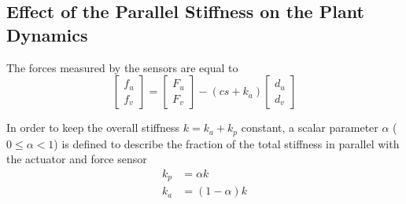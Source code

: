 \documentclass{ISMA_USD2020}
\begin{document}
\subsection{Effect of the Parallel Stiffness on the Plant Dynamics}
\label{sec:orgb29f2a0}
The forces measured by the sensors are equal to
\begin{equation}
\label{eq:measured_force_kp}
  \begin{bmatrix} f_{u} \\ f_{v} \end{bmatrix} =
  \begin{bmatrix} F_u \\ F_v \end{bmatrix} - (c s + k_a)
  \begin{bmatrix} d_u \\ d_v \end{bmatrix}
\end{equation}

In order to keep the overall stiffness \(k = k_a + k_p\) constant, a scalar parameter \(\alpha\) (\(0 \le \alpha < 1\)) is defined to describe the fraction of the total stiffness in parallel with the actuator and force sensor
\begin{subequations}
  \begin{align}
    k_p &= \alpha k \\
    k_a &= (1 - \alpha) k
  \end{align}
\end{subequations}
\end{document}
